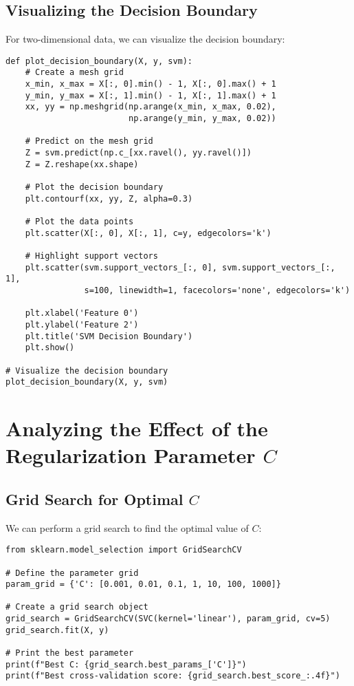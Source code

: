 \documentclass{article}
\begin{document}
\subsection{Visualizing the Decision Boundary}

For two-dimensional data, we can visualize the decision boundary:

\begin{lstlisting}[caption=Visualizing the SVM Decision Boundary]
def plot_decision_boundary(X, y, svm):
    # Create a mesh grid
    x_min, x_max = X[:, 0].min() - 1, X[:, 0].max() + 1
    y_min, y_max = X[:, 1].min() - 1, X[:, 1].max() + 1
    xx, yy = np.meshgrid(np.arange(x_min, x_max, 0.02),
                         np.arange(y_min, y_max, 0.02))
    
    # Predict on the mesh grid
    Z = svm.predict(np.c_[xx.ravel(), yy.ravel()])
    Z = Z.reshape(xx.shape)
    
    # Plot the decision boundary
    plt.contourf(xx, yy, Z, alpha=0.3)
    
    # Plot the data points
    plt.scatter(X[:, 0], X[:, 1], c=y, edgecolors='k')
    
    # Highlight support vectors
    plt.scatter(svm.support_vectors_[:, 0], svm.support_vectors_[:, 1],
                s=100, linewidth=1, facecolors='none', edgecolors='k')
    
    plt.xlabel('Feature 0')
    plt.ylabel('Feature 2')
    plt.title('SVM Decision Boundary')
    plt.show()

# Visualize the decision boundary
plot_decision_boundary(X, y, svm)
\end{lstlisting}

\section{Analyzing the Effect of the Regularization Parameter $C$}

\subsection{Grid Search for Optimal $C$}

We can perform a grid search to find the optimal value of $C$:

\begin{lstlisting}[caption=Grid Search for Optimal C]
from sklearn.model_selection import GridSearchCV

# Define the parameter grid
param_grid = {'C': [0.001, 0.01, 0.1, 1, 10, 100, 1000]}

# Create a grid search object
grid_search = GridSearchCV(SVC(kernel='linear'), param_grid, cv=5)
grid_search.fit(X, y)

# Print the best parameter
print(f"Best C: {grid_search.best_params_['C']}")
print(f"Best cross-validation score: {grid_search.best_score_:.4f}")
\end{lstlisting}
\end{document}
